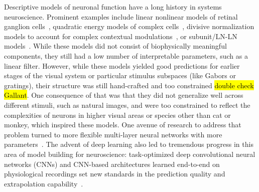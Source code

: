 \documentclass[B2,COG]{ercgrant}
\begin{document}
Descriptive models of neuronal function have a long history in systems neuroscience.
Prominent examples include linear nonlinear models of retinal ganglion cells~\parencite{Paninski2004-ax,Pillow2008-me}, quadratic energy models of complex cells~\parencite{Adelson1985-re}, divisive normalization models to account for complex contextual modulations~\parencite{Heeger1992-xx}, or subunit/LN-LN models~\parencite{Rust2005-ro,Touryan2005-pi,Vintch2015-gc}.
While these models did not consist of biophysically meaningful components, they still had a low number of interpretable parameters, such as a linear filter. 
However, while these models yielded good predictions for earlier stages of the visual system or particular stimulus subspaces (like Gabors or gratings), their structure was still hand-crafted and too constrained \hl{double check Gallant}. 
One consequence of that was that they did not generalize well across different stimuli, such as natural images, and were too constrained to reflect the complexities of neurons in higher visual areas or species other than cat or monkey, which inspired these models.
One avenue of research to address that problem turned to more flexible multi-layer neural networks with more parameters~\parencite{Zipser1988-nh,Lehky1992-wf,Lau2002-gb,Prenger2004-qu}.
The advent of deep learning also led to tremendous progress in this area of model building for neuroscience: task-optimized deep convolutional neural networks (CNNs) \parencite{Yamins2014-cg,Cadieu2014-gc,Cadena2017-rb} and CNN-based architectures learned end-to-end on physiological recordings set new standards in the prediction quality and extrapolation capability~\parencite{Antolik2016-va,Batty2016-do,McIntosh2016-tr,Klindt2017-sb,Kindel2017-xs,Cadena2017-rb,Burg2021-yg, Lurz2020-ua, Bashiri2021-or,Zhang2018-cs,Cowley2020-cy,Ecker2018-gz, Sinz2018-sk, Walker2019-yw, Franke2022-do}. 
\end{document}
